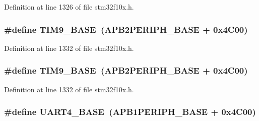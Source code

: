 Definition at line 1326 of file stm32f10x.\+h.

\subsubsection[{\texorpdfstring{T\+I\+M9\+\_\+\+B\+A\+SE}{TIM9_BASE}}]{\setlength{\rightskip}{0pt plus 5cm}\#define T\+I\+M9\+\_\+\+B\+A\+SE~({\bf A\+P\+B2\+P\+E\+R\+I\+P\+H\+\_\+\+B\+A\+SE} + 0x4\+C00)}\hypertarget{group___peripheral__memory__map_ga92ae902be7902560939223dd765ece08}{}\label{group___peripheral__memory__map_ga92ae902be7902560939223dd765ece08}


Definition at line 1332 of file stm32f10x.\+h.

\subsubsection[{\texorpdfstring{T\+I\+M9\+\_\+\+B\+A\+SE}{TIM9_BASE}}]{\setlength{\rightskip}{0pt plus 5cm}\#define T\+I\+M9\+\_\+\+B\+A\+SE~({\bf A\+P\+B2\+P\+E\+R\+I\+P\+H\+\_\+\+B\+A\+SE} + 0x4\+C00)}\hypertarget{group___peripheral__memory__map_ga92ae902be7902560939223dd765ece08}{}\label{group___peripheral__memory__map_ga92ae902be7902560939223dd765ece08}


Definition at line 1332 of file stm32f10x.\+h.

\subsubsection[{\texorpdfstring{U\+A\+R\+T4\+\_\+\+B\+A\+SE}{UART4_BASE}}]{\setlength{\rightskip}{0pt plus 5cm}\#define U\+A\+R\+T4\+\_\+\+B\+A\+SE~({\bf A\+P\+B1\+P\+E\+R\+I\+P\+H\+\_\+\+B\+A\+SE} + 0x4\+C00)}\hypertarget{group___peripheral__memory__map_ga94d92270bf587ccdc3a37a5bb5d20467}{}\label{group___peripheral__memory__map_ga94d92270bf587ccdc3a37a5bb5d20467}


